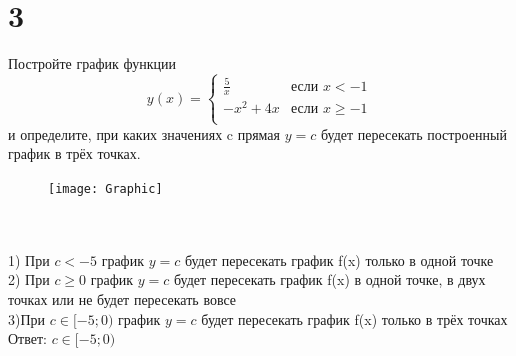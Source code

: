\documentclass{article}
\begin{document}
	\section{3}
  
  	Постройте график функции\\
	\begin{equation*}
	y(x) = 
	\begin{cases}
	\frac{5}{x} &\text{если $x < -1$}\\
	-x^2+4x &\text{если $x \ge -1$}\\
	\end{cases}
	\end{equation*}
	и определите, при каких значениях c  прямая {$y=c$}   будет пересекать построенный график в трёх точках.\\
	\graphicspath{{Pictures/}}
	\begin{figure}[hb]
		\begin{center}
			\texttt{[image: Graphic]}
		\end{center}
	\end{figure}
	\\
	\\
	1) При {$c<-5$} график  {$y=c$} будет пересекать график f(x) только в одной точке\\
	2) При {$c \geq 0$}  график  {$y=c$} будет пересекать график f(x) в одной точке, в двух точках или не будет пересекать вовсе\\
	3)При {$c \in [-5;0)$} график  {$y=c$} будет пересекать график f(x) только в трёх точках\\
	Ответ: {$c \in [-5;0)$}
  
\end{document}
